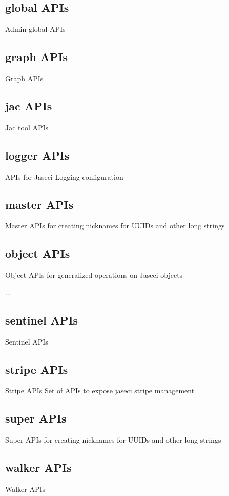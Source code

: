 \subsection{global APIs}

Admin global APIs

\subsection{graph APIs}

Graph APIs

\subsection{jac APIs}

Jac tool APIs

\subsection{logger APIs}

APIs for Jaseci Logging configuration

\subsection{master APIs}

Master APIs for creating nicknames for UUIDs and other long strings

\subsection{object APIs}

Object APIs for generalized operations on Jaseci objects
\par
...

\subsection{sentinel APIs}

Sentinel APIs

\subsection{stripe APIs}

Stripe APIs
Set of APIs to expose jaseci stripe management

\subsection{super APIs}

Super APIs for creating nicknames for UUIDs and other long strings

\subsection{walker APIs}

Walker APIs

